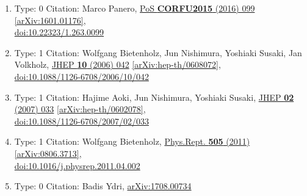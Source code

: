 \documentclass[a4paper,10pt]{article}
\begin{document}
\begin{enumerate}
\begin{enumerate}
  \item Type: 0 Citation: Marco Panero, \href{https://www.doi.org/10.22323/1.263.0099}{PoS {\bf CORFU2015} (2016) 099}  \href{https://arxiv.org/abs/1601.01176}{[arXiv:1601.01176]},\\\href{https://www.doi.org/10.22323/1.263.0099}{doi:10.22323/1.263.0099}
  \item Type: 1 Citation: Wolfgang Bietenholz, Jun Nishimura, Yoshiaki Susaki, Jan Volkholz, \href{https://www.doi.org/10.1088/1126-6708/2006/10/042}{JHEP {\bf 10} (2006) 042}  \href{https://arxiv.org/abs/hep-th/0608072}{[arXiv:hep-th/0608072]},\\\href{https://www.doi.org/10.1088/1126-6708/2006/10/042}{doi:10.1088/1126-6708/2006/10/042}
  \item Type: 1 Citation: Hajime Aoki, Jun Nishimura, Yoshiaki Susaki, \href{https://www.doi.org/10.1088/1126-6708/2007/02/033}{JHEP {\bf 02} (2007) 033}  \href{https://arxiv.org/abs/hep-th/0602078}{[arXiv:hep-th/0602078]},\\\href{https://www.doi.org/10.1088/1126-6708/2007/02/033}{doi:10.1088/1126-6708/2007/02/033}
  \item Type: 1 Citation: Wolfgang Bietenholz, \href{https://www.doi.org/10.1016/j.physrep.2011.04.002}{Phys.Rept. {\bf 505} (2011) }  \href{https://arxiv.org/abs/0806.3713}{[arXiv:0806.3713]},\\\href{https://www.doi.org/10.1016/j.physrep.2011.04.002}{doi:10.1016/j.physrep.2011.04.002}
  \item Type: 0 Citation: Badis Ydri, \href{https://arxiv.org/abs/1708.00734}{arXiv:1708.00734}

\end{enumerate}
\end{enumerate}
\end{document}
